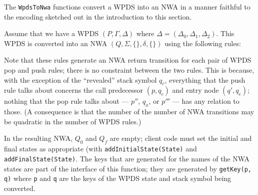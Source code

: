 The \texttt{WpdsToNwa} functions convert a WPDS into an NWA in a manner
faithful to the encoding sketched out in the introduction to this section.

Assume that we have a WPDS $(P, \Gamma, \Delta )$ 
where $\Delta = (\Delta_0, \Delta_1, \Delta_2)$. This 
WPDS is converted into an NWA $(Q,\Sigma,\{\},\delta,\{\})$ using the following rules:


Note that these rules generate an NWA return transition for each pair of WPDS pop
and push rules; there is no constraint between the two rules.  This is
because, with the exception of the ``revealed'' stack symbol $q_r$,
everything that the push rule talks about concerns the call predecessor
$(p,q_c)$ and entry node $(q', q_e)$; nothing that the pop rule talks about ---
$p''$, $q_x$, or $p'''$ --- has any relation to those. (A consequence is that the
number of the number of NWA transitions may be quadratic in the number of
WPDS rules.)


In the resulting NWA, $Q_0$ and $Q_f$ are empty; client code must set the initial and
final states as appropriate (with \texttt{addInitialState(State)} and
\texttt{addFinalState(State)}. The keys that are generated for the names of the
NWA states are part of the interface of this function; they are generated by
\texttt{getKey(p, q)} where \texttt{p} and \texttt{q} are the keys of the
WPDS state and stack symbol being converted.

